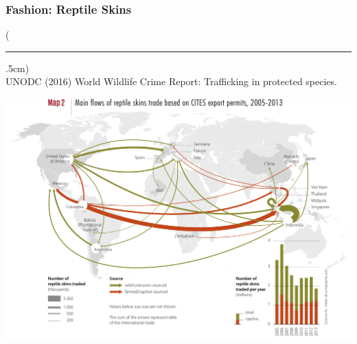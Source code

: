 \documentclass[10pt]{beamer}
\newenvironment{reference}[2]{%
	\begin{textblock*}{\textwidth}(#1,#2)
		\tiny\bgroup\color{gray}}{\egroup\end{textblock*}}
\begin{document}
\begin{frame}[t]
\frametitle{Fashion: Reptile Skins}
\vspace{0.25cm}

	\begin{reference}{4mm}{92mm}
		\rule{1.5cm}{0.25pt}\\
		UNODC (2016) World Wildlife Crime Report: Trafficking in protected species.
	\end{reference}
	
	\begin{center}
		\includegraphics[width=1.0\textwidth]{figures/map3b.png}
	\end{center}
\end{frame}
\end{document}

